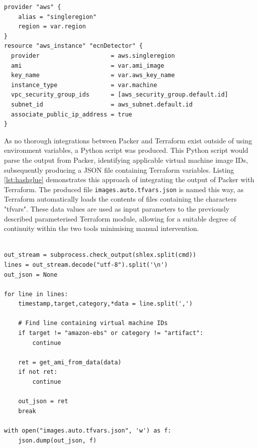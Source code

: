 \documentclass{l4proj}
\begin{document}
\begin{lstlisting}[caption={A demonstration of a parameterised Terraform module facilitating the multi-region deployment required to attain the goals of the research. details of IP address assignment and firewall rules have been omitted for the sake of brevity.}, label={lst:terramod}]
provider "aws" {
    alias = "singleregion"
    region = var.region
}
resource "aws_instance" "ecnDetector" {
  provider                    = aws.singleregion
  ami                         = var.ami_image
  key_name                    = var.aws_key_name
  instance_type               = var.machine
  vpc_security_group_ids      = [aws_security_group.default.id]
  subnet_id                   = aws_subnet.default.id
  associate_public_ip_address = true
}

\end{lstlisting}

As no thorough integrations between Packer and Terraform exist outside of using environment variables, a Python script was produced. This Python script would parse the output from Packer, identifying applicable virtual machine image IDs, subsequently producing a JSON file containing Terraform variables. Listing \ref{lst:hashglue} demonstrates this approach of integrating the output of Packer with Terraform. The produced file \lstinline{images.auto.tfvars.json} is named this way, as Terraform automatically loads the contents of files containing the characters "tfvars". These data values are used as input parameters to the previously described parameterised Terraform module, allowing for a suitable degree of continuity within the two tools minimising manual intervention.

\begin{lstlisting}[caption={A demonstration of extracting produced virtual machine image IDs from packer, subsequently producing a data file amenable for use within Terraform.},label={lst:hashglue}]

out_stream = subprocess.check_output(shlex.split(cmd))
lines = out_stream.decode("utf-8").split('\n')
out_json = None

for line in lines:
    timestamp,target,category,*data = line.split(',')
    
    # Find line containing virtual machine IDs
    if target != "amazon-ebs" or category != "artifact":
        continue
    
    ret = get_ami_from_data(data)
    if not ret:
        continue

    out_json = ret
    break

with open("images.auto.tfvars.json", 'w') as f:
    json.dump(out_json, f)

\end{lstlisting}
\end{document}
